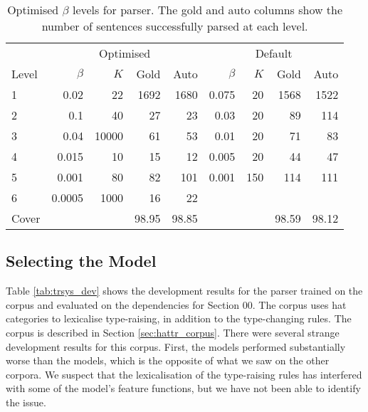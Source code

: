 \begin{table}
\centering
 \begin{tabular}{l|rrrr|rrrr}
\hline
      & \multicolumn{4}{c|}{Optimised}& \multicolumn{4}{c}{Default} \\
Level & $\beta$ & $K$ & Gold & Auto  & $\beta$ & $K$  & Gold & Auto \\
\hline
\hline
1     & 0.02   & 22    & 1692 & 1680 & 0.075 & 20  & 1568 & 1522\\
2     & 0.1    & 40    & 27   & 23   & 0.03  & 20  & 89   & 114 \\
3     & 0.04   & 10000 & 61   & 53   & 0.01  & 20  & 71   & 83  \\
4     & 0.015  & 10    & 15   & 12   & 0.005 & 20  & 44   & 47  \\
5     & 0.001  & 80    & 82   & 101  & 0.001 & 150 & 114  & 111 \\
6     & 0.0005 & 1000  & 16   & 22   &       &     &      &     \\
\hline
Cover &        &       &98.95 & 98.85&       &     & 98.59& 98.12\\
\hline
\end{tabular}
\caption[Optimised $\beta$ levels for \nounary parser.]{Optimised $\beta$ levels
for \nounary parser. The gold and auto columns show the number of sentences
successfully parsed at each level.\label{tab:nounary_betas}}
\end{table}

\subsection{Selecting the \trsys Model}
\label{sec:hattr_dev}
Table \ref{tab:trsys_dev} shows the development results for the parser trained
on the \trsys corpus and evaluated on the \ccgbank dependencies for Section 00.
The corpus uses hat categories to lexicalise type-raising, in addition to the
type-changing rules. The corpus is described in Section
\ref{sec:hattr_corpus}. There were several strange development results for this
corpus. First, the \hybrid models performed substantially worse than the \derivs
models, which is the opposite of what we saw on the other corpora. We suspect
that the lexicalisation of the type-raising rules has interfered with some of
the \hybrid model's feature functions, but we have not been able to identify the
issue.

